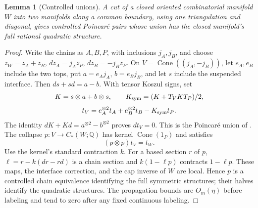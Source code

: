 \documentclass[11pt]{amsart}
\numberwithin{equation}{section}
\newtheorem{lemma}[lemma]{Lemma}
\theoremstyle{definition}
\theoremstyle{remark}
\newcommand{\Q}{\mathbb Q}
\begin{document}
\begin{lemma}[Controlled unions]\label{bd:union}
A cut of a closed oriented combinatorial manifold $W$ into two manifolds
along a common boundary, using one triangulation and diagonal, gives
controlled Poincar\'e pairs whose union has the closed manifold's full
rational quadratic structure.
\end{lemma}
\begin{proof}
Write the chains as $A,B,P$, with inclusions $j_A,j_B$, and choose
$z_W=z_A+z_B$, $dz_A=j_Az_P$, $dz_B=-j_Bz_P$.
On $V=\operatorname{Cone}((j_A,-j_B))$, let $e_A,e_B$ include the
two tops, put $a=e_Aj_A$, $b=e_Bj_B$, and let $s$ include the
suspended interface. Then $ds+sd=a-b$. With tensor Koszul signs, set
\[
 K=s\otimes a+b\otimes s,\qquad
 K_{\rm sym}=(K+T_VKT_P)/2,
\]
\[
 t_V=e_A^{\otimes2}t_A+e_B^{\otimes2}t_B-K_{\rm sym}t_P.
\]
The identity $dK+Kd=a^{\otimes2}-b^{\otimes2}$ proves $dt_V=0$.
This is the Poincar\'e union of \cite[\S3]{Ran80I}.
The collapse $p:V\to C_*(W;\Q)$ has kernel
$\operatorname{Cone}(1_P)$ and satisfies
\begin{equation}\label{bd:union-tensor}
 (p\otimes p)t_V=t_W.
\end{equation}
Use the kernel's standard contraction $k$.
For a based section $r$ of $p$, $\ell=r-k(dr-rd)$ is a chain
section and $k(1-\ell p)$ contracts $1-\ell p$.
These maps, the interface correction, and the cap inverse of $W$
are local. Hence $p$ is a controlled chain equivalence identifying
the full symmetric structures; their halves identify the quadratic
structures. The propagation bounds are $O_m(\eta)$ before labeling
and tend to zero after any fixed continuous labeling.
\end{proof}
\end{document}
